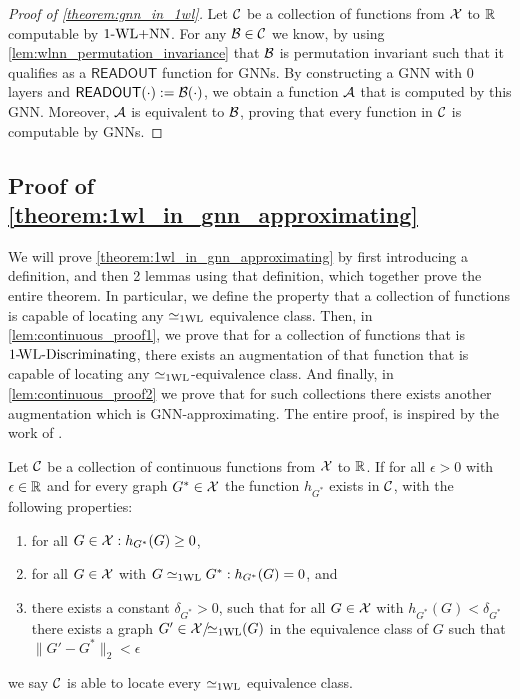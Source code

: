 \begin{proof}[Proof of \cref{theorem:gnn_in_1wl}]
    Let $\mathcal{C}$ be a collection of functions from $\mathcal{X}$ to $\mathbb{R}$ computable by $\text{1-WL+NN}$. For any $\mathcal{B} \in \mathcal{C}$ we know, by using \cref{lem:wlnn_permutation_invariance} that $\mathcal{B}$ is permutation invariant such that it qualifies as a $\textsf{READOUT}$ function for GNNs. By constructing a GNN with $0$ layers and $\textsf{READOUT}(\cdot) := \mathcal{B}(\cdot)$, we obtain a function $\mathcal{A}$ that is computed by this GNN. Moreover, $\mathcal{A}$ is equivalent to $\mathcal{B}$, proving that every function in $\mathcal{C}$ is computable by GNNs.
\end{proof}

\subsection{Proof of \cref{theorem:1wl_in_gnn_approximating}}
We will prove \cref{theorem:1wl_in_gnn_approximating} by first introducing a definition, and then 2 lemmas using that definition, which together prove the entire theorem. In particular, we define the property that a collection of functions is capable of locating any $\simeq_{\text{1WL}}$ equivalence class. Then, in \cref{lem:continuous_proof1}, we prove that for a collection of functions that is $\text{1-\!WL-Discriminating}$, there exists an augmentation of that function that is capable of locating any $\simeq_{\text{1WL}}$-equivalence class. And finally, in \cref{lem:continuous_proof2} we prove that for such collections there exists another augmentation which is GNN-approximating. The entire proof, is inspired by the work of \cite{Chen2019}.

\begin{definition}
    Let $\mathcal{C}$ be a collection of continuous functions from $\mathcal{X}$ to $\mathbb{R}$. If for all $\epsilon > 0$ with $\epsilon \in \mathbb{R}$ and for every graph $G^* \in \mathcal{X}$ the function $h_{G^*}$ exists in $\mathcal{C}$, with the following properties:
    \begin{enumerate}
        \item for all $G \in \mathcal{X}:  h_{G^*}(G) \geq 0$,
        \item for all $G \in \mathcal{X}$ with $G \simeq_{\text{1WL}} G^*: h_{G^*}(G)=0$, and
        \item there exists a constant $\delta_{G^*} > 0$, such that for all $G \in \mathcal{X}$ with $h_{G^*}(G) < \delta_{G^*}$ there exists a graph $G' \in \mathcal{X}/\!{\simeq_{\text{1WL}}}(G)$ in the equivalence class of $G$ such that $\| G' - G^* \|_2 < \epsilon$
    \end{enumerate}
    we say $\mathcal{C}$ is able to locate every $\simeq_{\text{1WL}}$ equivalence class.
\end{definition}

